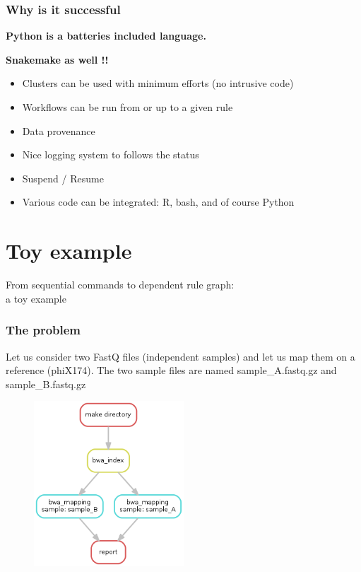 \documentclass{beamer}
\begin{document}
\begin{frame}
 \frametitle{Why is it successful}
 \centering
 \textbf{Python is a batteries included language. }

 \vspace{1cm}
 \pause
 \textbf{Snakemake as well !!}
 
 \pause
   \begin{itemize}
    \item  Clusters can be used with minimum efforts (no intrusive code)
    \item  Workflows can be run from or up to a given rule
    \item  Data provenance
    \item  Nice logging system to follows the status
    \item  Suspend /  Resume 
    \item  Various code can be integrated: R, bash, and of course Python
   \end{itemize}
\end{frame}





\section{Toy example}

\begin{frame}[plain]
 \centering
 \begin{Huge}
 From sequential commands to dependent rule graph: \\ a toy example
 \end{Huge}
\end{frame}



\begin{frame}
\frametitle{The problem}
Let us consider two FastQ files (independent samples) and let us map them on a reference (phiX174). The two 
sample files are named sample\_A.fastq.gz and sample\_B.fastq.gz
  \begin{figure}
\includegraphics[width=0.5\textwidth, height=0.5\textheight]{images/dag.png}
  \end{figure}
\end{frame}
\end{document}
